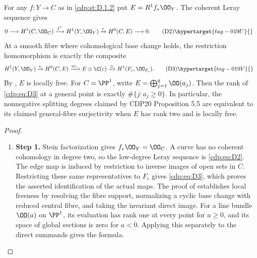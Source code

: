 \begin{proposition}\hypertarget{tag-01G2}{}\label{cdp:st:D.1.4}

For any $f:Y\to C$ as in \ref{cdp:st:D.1.2} put $E=R^1f_*\OO_Y$.
The coherent Leray sequence gives
\[
0\longrightarrow H^1(C,\OO_C)\xrightarrow{f^*}H^1(Y,\OO_Y)
\xrightarrow{e}H^0(C,E)\longrightarrow0.               \tag{D2}\hypertarget{tag-019U}{}\label{cdp:eq:D2}
\]
At a smooth fibre where cohomological base change holds, the
restriction homomorphism is exactly the composite
\[
H^1(Y,\OO_Y)\xrightarrow{e}H^0(C,E)
\xrightarrow{\operatorname{ev}_c}E\otimes\C(c)
\xrightarrow{\simeq}H^1(F_c,\OO_{F_c}).               \tag{D3}\hypertarget{tag-019V}{}\label{cdp:eq:D3}
\]
By \cite[Theorem~2.2, pp.~4--5]{Viaclovsky2026Combs}, $E$ is locally free. For $C=\PP^1$, write
$E=\bigoplus_{j=1}^q\OO(a_j)$.
Then the rank of \eqref{cdp:eq:D3} at a general point is exactly
$\#\{j:a_j\geq0\}$. In particular, the nonnegative splitting
degrees claimed by CDP20 Proposition 5.5 are equivalent to its
claimed general-fibre surjectivity when $E$ has rank two and is
locally free.
\end{proposition}


\begin{proof}
\begin{enumerate}[label={$\langle1\rangle$\arabic*.},leftmargin=*]
\item 
\noindent\textbf{Step 1.} Stein factorization gives $f_*\OO_Y=\OO_C$. A curve has no coherent
cohomology in degree two, so the low-degree Leray sequence is \eqref{cdp:eq:D2}.
The edge map is induced by restriction to inverse images of open
sets in $C$. Restricting these same representatives to $F_c$ gives
\eqref{cdp:eq:D3}, which proves the asserted identification of the actual maps.
The proof of \cite[Theorem~2.2, pp.~4--5]{Viaclovsky2026Combs} establishes local freeness by resolving the fibre support,
normalizing a cyclic base change with reduced central fibre, and
taking the invariant direct image. For a line bundle
$\OO(a)$ on $\PP^1$, its evaluation has rank one at every point
for $a\geq0$, and its space of global sections is zero for $a<0$.
Applying this separately to the direct summands gives the formula.

\end{enumerate}
\end{proof}